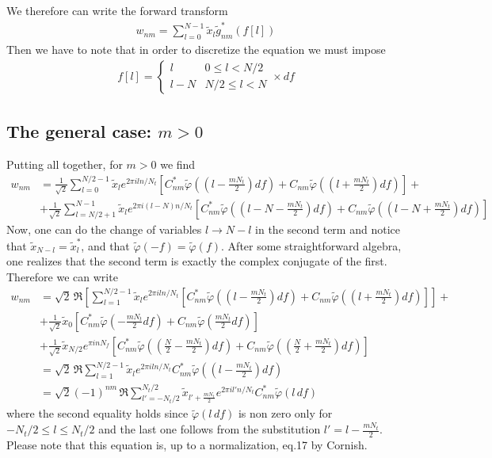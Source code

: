 \documentclass[%
 reprint,
superscriptaddress,
nofootinbib,
 amsmath,amssymb,
 aps,
colorlinks = true, 
linkcolor = blue, 
urlcolor = blue, 
citecolor = blue, 
anchorcolor = blue,
]{revtex4-2}
\begin{document}
%
We therefore can write the forward transform
%
\begin{align}
w_{nm}=\sum_{l=0}^{N-1} \tilde{x}_l \tilde g_{nm}^*(f[l])
\end{align}
%
Then we have to note that in order to discretize the equation we must impose
%
\begin{align}
f[l]=\begin{cases}
    l & 0\leq l< N/2 \\
    l-N & N/2\leq l<N
\end{cases}\times df
\end{align}
%

\subsection{The general case: $m>0$}
Putting all together, for $m>0$ we find
%
\begin{align}
w_{nm}&=\frac{1}{\sqrt{2}}\sum_{l=0}^{N/2-1} \tilde{x}_l e^{2\pi iln/N_t}\left[C_{nm}^*\tilde{\varphi}\left((l-\frac{mN_t}{2})df\right)+C_{nm}\tilde{\varphi}\left((l+\frac{mN_t}{2})df\right)\right]+\nonumber\\
&+\frac{1}{\sqrt{2}}\sum_{l=N/2+1}^{N-1} \tilde{x}_l e^{2\pi i(l-N)n/N_t}\left[C_{nm}^*\tilde{\varphi}\left((l-N-\frac{mN_t}{2})df\right)+C_{nm}\tilde{\varphi}\left((l-N+\frac{mN_t}{2})df\right)\right]
\end{align}
%
Now, one can do the change of variables $l\to N-l$ in the second term and notice that $\tilde{x}_{N-l}=\tilde{x}^*_l$, and that $\tilde{\varphi}(-f)=\tilde{\varphi}(f)$. After some straightforward algebra, one realizes that the second term is exactly the complex conjugate of the first. Therefore we can write
%
\begin{align}\label{wnm_m_general}
w_{nm}&=\sqrt{2}\,\Re\left[\sum_{l=1}^{N/2-1} \tilde{x}_l e^{2\pi iln/N_t}\left[C_{nm}^*\tilde{\varphi}\left((l-\frac{mN_t}{2})df\right)+C_{nm}\tilde{\varphi}\left((l+\frac{mN_t}{2})df\right)\right]\right]+\nonumber\\
&+ \frac{1}{\sqrt{2}}\tilde{x}_0 \left[C_{nm}^*\tilde{\varphi}\left(-\frac{mN_t}{2}df\right)+C_{nm}\tilde{\varphi}\left(\frac{mN_t}{2}df\right)\right]\nonumber\\
&+ \frac{1}{\sqrt{2}}\tilde{x}_{N/2}e^{\pi i n N_f} \left[C_{nm}^*\tilde{\varphi}\left((\frac{N}{2}-\frac{mN_t}{2})df\right)+C_{nm}\tilde{\varphi}\left((\frac{N}{2}+\frac{mN_t}{2})df\right)\right]\nonumber\\
&=\sqrt{2}\,\Re\sum_{l=1}^{N/2-1} \tilde{x}_l e^{2\pi iln/N_t}C_{nm}^*\tilde{\varphi}\left((l-\frac{mN_t}{2})df\right)\nonumber\\
&=\sqrt{2}(-1)^{nm}\,\Re\sum_{l'=-N_t/2}^{N_t/2} \tilde{x}_{l'+\frac{mN_t}{2}} e^{2\pi il'n/N_t}C_{nm}^*\tilde{\varphi}(l\,df)
\end{align}
%
where the second equality holds since $\tilde{\varphi}(l\,df)$ is non zero only for $-N_t/2\leq l\leq N_t/2$ and the last one follows from the substitution $l'= l-\frac{mN_t}{2}$. Please note that this equation is, up to a normalization, eq.17 by Cornish.
\end{document}
